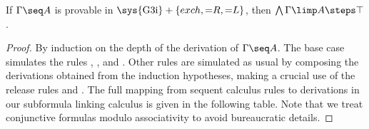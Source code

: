 \begin{theorem}
  If $\Gamma \seq A$ is provable in $\text{\sys{G3i}} + \{exch, {=}R, {=}L\}$,
  then $\bigwedge \Gamma \limp A \steps \top$.
\end{theorem}
\begin{proof}
  By induction on the depth of the derivation of $\Gamma \seq A$. The base case
  simulates the rules {}, {}, {} and
  {}. Other rules are simulated as usual by composing the derivations
  obtained from the induction hypotheses, making a crucial use of the release
  rules {} and {}. The full mapping from sequent
  calculus rules to derivations in our subformula linking calculus is given in
  the following table. Note that we treat conjunctive formulas modulo
  associativity to avoid bureaucratic details.


\end{proof}
